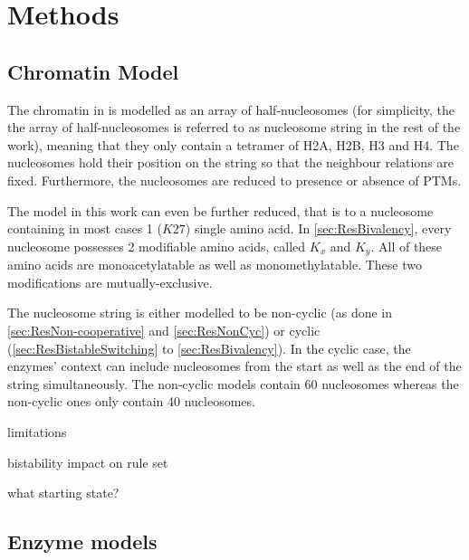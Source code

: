 \chapter{Methods}
    \label{cha:methods}
    \section{Chromatin Model}
        The chromatin in \ed is modelled as an array of half-nucleosomes (for simplicity, the the array of half-nucleosomes  is referred to as nucleosome string in the rest of the work), meaning that they only contain a tetramer of H2A, H2B, H3 and H4. The nucleosomes hold their position on the string so that the neighbour relations are fixed. Furthermore, the nucleosomes are reduced to presence or absence of PTMs.

        The model in this work can even be further reduced, that is to a nucleosome containing in most cases 1 ($K27$) single amino acid. In \ref{sec:ResBivalency}, every nucleosome possesses 2 modifiable amino acids, called $K_x$ and $K_y$. All of these amino acids are monoacetylatable as well as monomethylatable. These two modifications are mutually-exclusive.

        The nucleosome string is either modelled to be non-cyclic (as done in \ref{sec:ResNon-cooperative} and \ref{sec:ResNonCyc}) or cyclic (\ref{sec:ResBistableSwitching} to \ref{sec:ResBivalency}). In the cyclic case, the enzymes' context can include nucleosomes from the start as well as the end of the string simultaneously. The non-cyclic models contain 60 nucleosomes whereas the non-cyclic ones only contain 40 nucleosomes.\\
        \begin{itemize}
            {
                \color{red}
                \item limitations
                \item bistability impact on rule set
                \item what starting state?
            }
        \end{itemize}

    \section{Enzyme models} %
